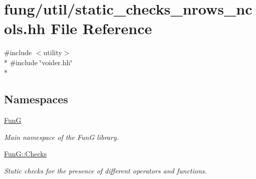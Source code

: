\hypertarget{static__checks__nrows__ncols_8hh}{\section{fung/util/static\-\_\-checks\-\_\-nrows\-\_\-ncols.hh File Reference}
\label{static__checks__nrows__ncols_8hh}
}
{\ttfamily \#include $<$utility$>$}\\*
{\ttfamily \#include \char`\"{}voider.\-hh\char`\"{}}\\*
\subsection*{Namespaces}
\begin{DoxyCompactItemize}
\item 
\hyperlink{namespaceFunG}{Fun\-G}
\begin{DoxyCompactList}\small\item\em Main namespace of the Fun\-G library. \end{DoxyCompactList}\item 
\hyperlink{namespaceFunG_1_1Checks}{Fun\-G\-::\-Checks}
\begin{DoxyCompactList}\small\item\em Static checks for the presence of different operators and functions. \end{DoxyCompactList}\end{DoxyCompactItemize}
